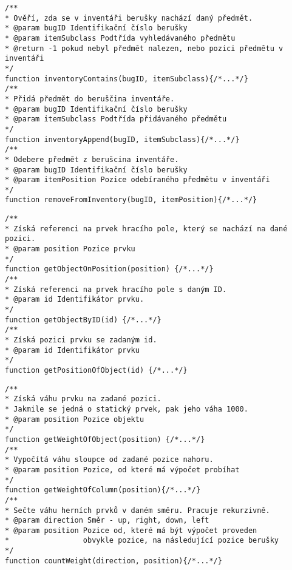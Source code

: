 \pagebreak

\begin{lstlisting}[caption=Funkce pro práci s beruščiným inventářem,label=code:logicInventory]
/**
* Ověří, zda se v inventáři berušky nachází daný předmět.
* @param bugID Identifikační číslo berušky
* @param itemSubclass Podtřída vyhledávaného předmětu
* @return -1 pokud nebyl předmět nalezen, nebo pozici předmětu v inventáři
*/
function inventoryContains(bugID, itemSubclass){/*...*/}
/**
* Přidá předmět do beruščina inventáře.
* @param bugID Identifikační číslo berušky
* @param itemSubclass Podtřída přidávaného předmětu
*/
function inventoryAppend(bugID, itemSubclass){/*...*/}
/**
* Odebere předmět z berušcina inventáře.
* @param bugID Identifikační číslo berušky
* @param itemPosition Pozice odebíraného předmětu v inventáři
*/
function removeFromInventory(bugID, itemPosition){/*...*/}
\end{lstlisting}

\begin{lstlisting}[caption=Funkce pro získávání reference na prvky herního pole,label=code:logicReference]
/** 
* Získá referenci na prvek hracího pole, který se nachází na dané pozici.
* @param position Pozice prvku
*/
function getObjectOnPosition(position) {/*...*/}
/** 
* Získá referenci na prvek hracího pole s daným ID.
* @param id Identifikátor prvku.
*/   
function getObjectByID(id) {/*...*/}
/** 
* Získá pozici prvku se zadaným id.
* @param id Identifikátor prvku
*/
function getPositionOfObject(id) {/*...*/}  
\end{lstlisting}

\begin{lstlisting}[caption=Funkce pro výpočet váhy objektů,label=code:logicWeight]
/**
* Získá váhu prvku na zadané pozici.
* Jakmile se jedná o statický prvek, pak jeho váha 1000.
* @param position Pozice objektu
*/
function getWeightOfObject(position) {/*...*/}    
/** 
* Vypočítá váhu sloupce od zadané pozice nahoru.
* @param position Pozice, od které má výpočet probíhat
*/
function getWeightOfColumn(position){/*...*/}  
/** 
* Sečte váhu herních prvků v daném směru. Pracuje rekurzivně.
* @param direction Směr - up, right, down, left
* @param position Pozice od, které má být výpočet proveden
*				  obvykle pozice, na následující pozice berušky
*/
function countWeight(direction, position){/*...*/} 
\end{lstlisting}

